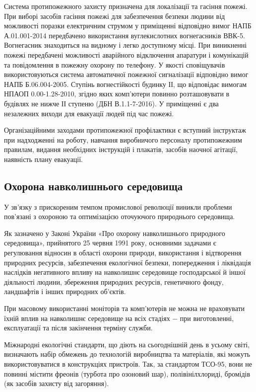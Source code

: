 Система протипожежного захисту призначена для локалізації та гасіння пожежі. При виборі засобів гасіння пожежі для забезпечення безпеки людини від можливості поразки електричним струмом у приміщенні відповідно вимог НАПБ А.01.001-2014 передбачено використання вуглекислотних вогнегасникiв ВВК-5. Вогнегасник знаходиться на видному і легко доступному місці. При виникненні пожежі передбачені можливості аварійного відключення апаратури і комунікацій та повідомлення в пожежну охорону по телефону. У якості сповіщувачів використовуються система автоматичної пожежної сигналізації відповідно вимог НАПБ Б.06.004-2005. Ступінь вогнестійкості будинку ІІ, що відповідає вимогам НПАОП 0.00-1.28-2010, згідно яких комп’ютери повинно розташовувати в будівлях не нижче ІІ ступеню (ДБН В.1.1-7-2016). У приміщенні є два незалежних виходи для евакуації людей під час пожежі.

Організаційними заходами протипожежної профілактики є вступний інструктаж при надходженні на роботу, навчання виробничого персоналу протипожежним правилам, видання необхідних інструкцій і плакатів, засобів наочної агітації, наявність плану евакуації.

\subsection{Охорона навколишнього середовища}

У зв’язку з прискореним темпом промислової революції виникли проблеми пов’язані з охороною та оптимізацією оточуючого природнього середовища.

Як зазначено у Законі України «Про охорону навколишнього природного середовища», прийнятого 25 червня 1991 року, основними задачами є регулювання відносин в області охорони природи, використання і відтворення природних ресурсів, забезпечення екологічної безпеки, попередження і ліквідація наслідків негативного впливу на навколишнє середовище господарської й іншої діяльності людини, збереження природних ресурсів, генетичного фонду, ландшафтів і інших природних об'єктів. 

При масовому використанні моніторів та комп’ютерів не можна не враховувати їхній вплив на навколишнє середовище на всіх стадіях $-$ при виготовленні, експлуатації та після закінчення терміну служби.

Міжнародні екологічні стандарти, що діють на сьогоднішній день в усьому світі, визначають набір обмежень до технологій виробництва та матеріалів, які можуть використовуватися в конструкціях пристроїв. Так, за стандартом ТСО-95, вони не повинні містити фреонів (турбота про озоновий шар), полівінілхлориді, бромідів (як засобів захисту від загоряння).

